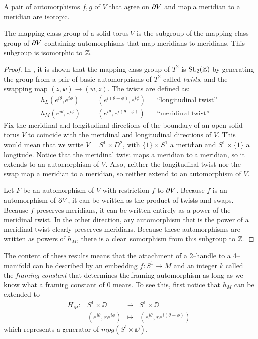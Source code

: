 \begin{lem}
	A pair of automorphisms $f,g$ of $V$ that agree on $\partial V$ and map a meridian to a meridian are isotopic.	
\end{lem}

\begin{theorem}
	The mapping class group of a solid torus $V$ is the subgroup of the mapping class group of $\partial V$ containing automorphisms that map meridians to meridians.
	This subgroup is isomorphic to $\mathbb{Z}$.	
\end{theorem}

\begin{proof}
	In \cite{Rolf76}, it is shown that the mapping class group of $T^2$ is $\textrm{SL}_2(\mathbb{Z})$ by generating the group from a pair of basic automorphisms of $T^2$ called \emph{twists}, and the swapping map $(z,w)\to(w,z)$.
	The twists are defined as:
	\[
	\begin{array}{ccccc}
	h_L(e^{i\theta},e^{i\phi}) & = & (e^{i(\theta+\phi)},e^{i\phi}) & & \textrm{``longitudinal twist''} \\
	
	h_M(e^{i\theta},e^{i\phi}) & = & (e^{i\theta},e^{i(\theta+\phi)}) & & \textrm{``meridinal twist''}	
	\end{array}
	\]
	Fix the meridinal and longitudinal directions of the boundary of an open solid torus $V$ to coincide with the meridinal and longitudinal directions of $V$.
	This would mean that we write $V=S^1\times D^2$, with $\{1\}\times S^1$ a meridian and $S^1\times\{1\}$ a longitude.
	Notice that the meridinal twist maps a meridian to a meridian, so it extends to an automorphism of $V$.
	Also, neither the longitudinal twist nor the swap map a meridian to a meridian, so neither extend to an automorphism of $V$.
	
	Let $F$ be an automorphism of $V$ with restriction $f$ to $\partial V$.
	Because $f$ is an automorphism of $\partial V$, it can be written as the product of twists and swaps.
	Because $f$ preserves meridians, it can be written entirely as a power of the meridinal twist.
	In the other direction, any automorphism that is the power of a meridinal twist clearly preserves meridians.
	Because these automorphisms are written as powers of $h_M$, there is a clear isomorphism from this subgroup to $\mathbb{Z}$.
\end{proof}

The content of these results means that the attachment of a 2--handle to a 4--manifold can be described by an embedding $f:S^1\to M$ and an integer $k$ called the \emph{framing constant} that determines the framing automorphism as long as we know what a framing constant of $0$ means.
To see this, first notice that $h_M$ can be extended to
\[
	\begin{array}{cccc}
		H_M: & S^1\times\DD & \to & S^1\times\DD \\
			& (e^{i\theta}, re^{i\phi}) & \mapsto & (e^{i\theta},re^{i(\theta+\phi)})	
	\end{array}
\]
which represents a generator of $mpg(S^1\times\DD)$.


